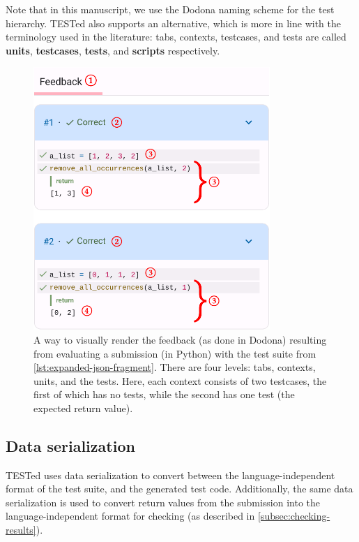 \documentclass[../main]{subfiles}
\begin{document}
Note that in this manuscript, we use the Dodona naming scheme for the test hierarchy.
TESTed also supports an alternative, which is more in line with the terminology used in the literature: tabs, contexts, testcases, and tests are called \textbf{units}, \textbf{testcases}, \textbf{tests}, and \textbf{scripts} respectively.

\begin{figure}
    \centering
    \includegraphics[width=0.8\textwidth]{dodona-rendering}
    \caption{A way to visually render the feedback (as done in Dodona) resulting from evaluating a submission (in Python) with the test suite from \vref{lst:expanded-json-fragment}.
    There are four levels:  tabs,  contexts,  units, and  the tests.
    Here, each context consists of two testcases, the first of which has no tests, while the second has one test (the expected return value).}
    \label{fig:dodona}
\end{figure}

\subsection{Data serialization}\label{subsec:data-serialization}

TESTed uses data serialization to convert between the language-independent format of the test suite, and the generated test code.
Additionally, the same data serialization is used to convert return values from the submission into the language-independent format for checking (as described in \vref{subsec:checking-results}).
\end{document}
